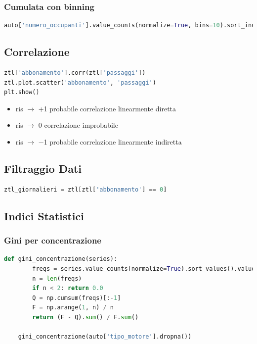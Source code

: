 \documentclass{article}
\begin{document}
\subsubsection*{Cumulata con binning}
\begin{lstlisting}[language=Python]
auto['numero_occupanti'].value_counts(normalize=True, bins=10).sort_index().cumsum()
\end{lstlisting}

\subsection*{Correlazione}

\begin{lstlisting}[language=Python]
ztl['abbonamento'].corr(ztl['passaggi'])
ztl.plot.scatter('abbonamento', 'passaggi')
plt.show()
\end{lstlisting}


\begin{itemize}
    \item ris $\to$ +1 probabile correlazione linearmente diretta
    \item ris $\to$ 0 correlazione improbabile
    \item ris $\to$ −1 probabile correlazione linearmente indiretta
\end{itemize}

\subsection*{Filtraggio Dati}

\begin{lstlisting}[language=Python]
    ztl_giornalieri = ztl[ztl['abbonamento'] == 0]
\end{lstlisting}

\subsection*{Indici Statistici}

\subsubsection*{Gini per concentrazione}
\begin{lstlisting}[language=Python]
    def gini_concentrazione(series):
        freqs = series.value_counts(normalize=True).sort_values().values
        n = len(freqs)
        if n < 2: return 0.0
        Q = np.cumsum(freqs)[:-1]
        F = np.arange(1, n) / n
        return (F - Q).sum() / F.sum()

    gini_concentrazione(auto['tipo_motore'].dropna())
\end{lstlisting}
\end{document}
